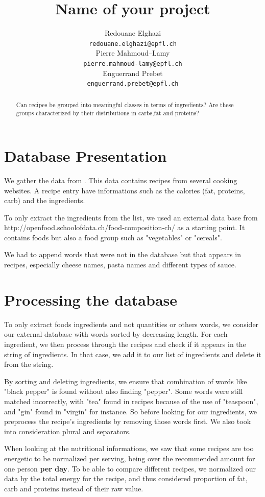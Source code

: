 \documentclass[11pt]{article}
\title{Name of your project}
\author{Redouane Elghazi \\
  {\tt redouane.elghazi@epfl.ch} \\\And
  Pierre Mahmoud--Lamy \\
  {\tt pierre.mahmoud-lamy@epfl.ch} \\\And
Enguerrand Prebet \\
{\tt enguerrand.prebet@epfl.ch} \\}
\date{}
\begin{document}
\maketitle
\begin{abstract}
	
	Can recipes be grouped into meaningful classes in terms of ingredients? Are these groups characterized by their distributions in carbs,fat and proteins?
\end{abstract}

\section{Database Presentation}
We gather the data from \cite{WestWhiteHorvitzWWW2013}. This data contains recipes from several cooking websites. A recipe entry have informations such as the calories (fat, proteins, carb) and the ingredients. 

To only extract the ingredients from the list, we used an external data base from  http://openfood.schoolofdata.ch/food-composition-ch/ as a starting point. It contains foods but also a food group such as "vegetables" or "cereals".

We had to append words that were not in the database but that appears in recipes, especially cheese names, pasta names and different types of sauce.

\section{Processing the database}
To only extract foods ingredients and not quantities or others words, we consider our external database with words sorted by decreasing length. For each ingredient, we then process through the recipes and check if it appears in the string of ingredients. In that case, we add it to our list of ingredients and delete it from the string.

By sorting and deleting ingredients, we ensure that combination of words like "black pepper" is found without also finding "pepper". Some words were still matched incorrectly, with "tea" found in recipes because of the use of "teaspoon", and "gin" found in "virgin" for instance. So before looking for our ingredients, we preprocess the recipe's ingredients by removing those words first.
We also took into consideration plural and separators.

When looking at the nutritional informations, we saw that some recipes are too energetic to be normalized per serving, being over the recommended amount for one person \textbf{per day}. To be able to compare different recipes, we normalized our data by the total energy for the recipe, and thus considered proportion of fat, carb and proteins instead of their raw value.
\end{document}
